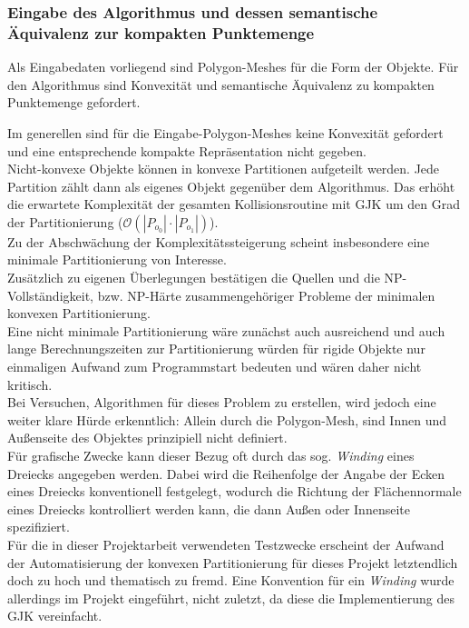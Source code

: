 \subsubsection{Eingabe des Algorithmus und dessen semantische Äquivalenz zur kompakten Punktemenge}
\label{sec:gjk_equiv}
Als Eingabedaten vorliegend sind Polygon-Meshes für die Form der Objekte.
Für den Algorithmus sind Konvexität und semantische Äquivalenz zu kompakten Punktemenge gefordert.

Im generellen sind für die Eingabe-Polygon-Meshes keine Konvexität gefordert und eine entsprechende kompakte Repräsentation nicht gegeben.\\
Nicht-konvexe Objekte können in konvexe Partitionen aufgeteilt werden. Jede Partition zählt dann als eigenes Objekt gegenüber dem Algorithmus. Das erhöht die erwartete Komplexität der gesamten Kollisionsroutine mit GJK um den Grad der Partitionierung ($\mathcal{O}(|P_{o_0}|\cdot |P_{o_1}|)$).\\
Zu der Abschwächung der Komplexitätssteigerung scheint insbesondere eine minimale Partitionierung von Interesse.\\
Zusätzlich zu eigenen Überlegungen bestätigen die Quellen \cite{ARTIGAS20111968} und \cite{grelier2019minimum} die NP-Vollständigkeit, bzw. NP-Härte zusammengehöriger Probleme der minimalen konvexen Partitionierung.\\
Eine nicht minimale Partitionierung wäre zunächst auch ausreichend und auch lange Berechnungszeiten zur Partitionierung würden für rigide Objekte nur einmaligen Aufwand zum Programmstart bedeuten und wären daher nicht kritisch.\\
Bei Versuchen, Algorithmen für dieses Problem zu erstellen, wird jedoch eine weiter klare Hürde erkenntlich: Allein durch die Polygon-Mesh, sind Innen und Außenseite des Objektes prinzipiell nicht definiert.\\
Für grafische Zwecke kann dieser Bezug oft durch das sog. \textit{Winding} \cite[ch.5.6, p.121, ch.7.3]{fourcrossfour}\cite{gjk-casey} eines Dreiecks angegeben werden. Dabei wird die Reihenfolge der Angabe der Ecken eines Dreiecks konventionell festgelegt, wodurch die Richtung der Flächennormale eines Dreiecks kontrolliert werden kann, die dann Außen oder Innenseite spezifiziert.\\
Für die in dieser Projektarbeit verwendeten Testzwecke erscheint der Aufwand der Automatisierung der konvexen Partitionierung für dieses Projekt letztendlich doch zu hoch und thematisch zu fremd. Eine Konvention für ein \textit{Winding} wurde allerdings im Projekt eingeführt, nicht zuletzt, da diese die Implementierung des GJK vereinfacht.
